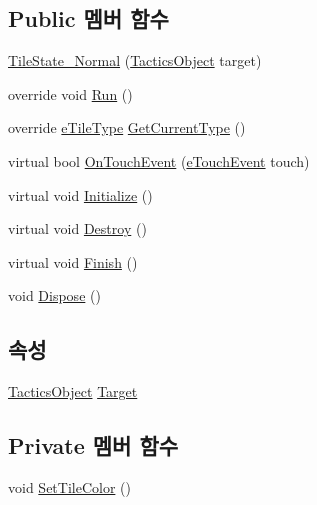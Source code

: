 \subsection*{Public 멤버 함수}
\begin{DoxyCompactItemize}
\item 
\hyperlink{class_tile_1_1_tile_state___normal_ad67f867107e747a20146e137cfb56eaf}{Tile\+State\+\_\+\+Normal} (\hyperlink{class_tactics_object}{Tactics\+Object} target)
\item 
override void \hyperlink{class_tile_1_1_tile_state___normal_acf613382b6ddeff2fcc226d8caeb0b53}{Run} ()
\item 
override \hyperlink{_tile_8cs_a271bc07be325bca511bcb747e0ff2fda}{e\+Tile\+Type} \hyperlink{class_tile_1_1_tile_state___normal_ad649955a61ea5ca2158b3c379ea8c505}{Get\+Current\+Type} ()
\item 
virtual bool \hyperlink{class_tile_1_1_tile_state_a8687f7cb0e2c1a436c5ac395f4f6d07a}{On\+Touch\+Event} (\hyperlink{_touch_manager_8cs_ae33e321a424fe84ba8b2fdb81ad40a68}{e\+Touch\+Event} touch)
\item 
virtual void \hyperlink{class_m_c_n_1_1_state_a5be59bc891e64cbbe4322d74a6746908}{Initialize} ()
\item 
virtual void \hyperlink{class_m_c_n_1_1_state_aebf48ef248bbf185d6aae91d9789459e}{Destroy} ()
\item 
virtual void \hyperlink{class_m_c_n_1_1_state_a2492ca731678b8216c02134dddeeb745}{Finish} ()
\item 
void \hyperlink{class_m_c_n_1_1_state_af6df0477e0dead784489688cb2c2093e}{Dispose} ()
\end{DoxyCompactItemize}
\subsection*{속성}
\begin{DoxyCompactItemize}
\item 
\hyperlink{class_tactics_object}{Tactics\+Object} \hyperlink{class_m_c_n_1_1_state_a79a563b32f183c9adc9a96679fc57eb8}{Target}
\end{DoxyCompactItemize}
\subsection*{Private 멤버 함수}
\begin{DoxyCompactItemize}
\item 
void \hyperlink{class_tile_1_1_tile_state___normal_a81d8bc6e280e6143ff42a292e863307e}{Set\+Tile\+Color} ()
\end{DoxyCompactItemize}


